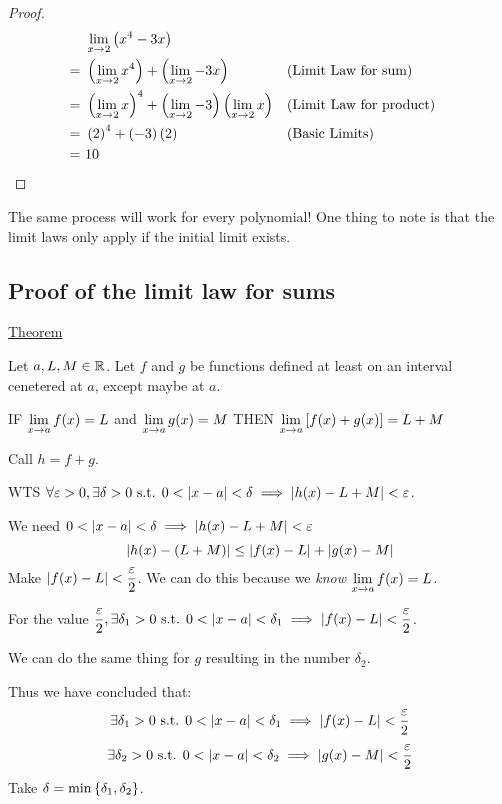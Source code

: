\begin{proof} \(\)
  \begin{align*}
    &~\lim_{x \to 2} \left(x^{4} - 3x\right) \\
    =&~\left(\lim_{x \to 2} x^{4}\right) + \left(\lim_{x \to 2} -3x\right) && \text{(Limit Law for sum)} \\
    =&~\left(\lim_{x \to 2} x\right)^{4} + \left(\lim_{x \to 2} -3\right) \left(\lim_{x \to 2} x\right) && \text{(Limit Law for product)}  \\
    =&~\left(2\right)^{4} + \left(-3\right) \left(2\right) && \text{(Basic Limits)} \\
    =&~10
  \end{align*}
\end{proof}

The same process will work for every polynomial! One thing to note is that the limit laws only apply if the initial limit exists.

\subsection{Proof of the limit law for sums}

\begin{mdframed}
  \underline{Theorem}

  Let \(a, L, M \in \mathbb{R}\). Let \(f\) and \(g\) be functions defined at least on an interval cenetered at \(a\), except maybe at \(a\).

  IF \(\displaystyle \lim_{x \to a} f(x) = L\) and \(\displaystyle \lim_{x \to a} g(x) = M\) THEN \(\displaystyle \lim_{x \to a} \left[f(x) + g(x)\right] = L + M\)
\end{mdframed}

Call \(h = f + g\).

WTS \(\forall \varepsilon > 0, \exists \delta > 0 \text{ s.t. } 0 < \left|x - a\right| < \delta \implies \left|h(x) - {L + M}\right| < \varepsilon\).

We need \(0 < \left|x - a\right| < \delta \implies \left|h(x) - {L + M}\right| < \varepsilon\)
\[\left|h(x) - \left(L + M\right)\right| \leq \left|f(x) - L\right| + \left|g(x) - M\right|\]
Make \(\displaystyle \left|f(x) - L\right| < \frac{\varepsilon}{2}\). We can do this because we \emph{know} \(\displaystyle \lim_{x \to a} f(x) = L\).

For the value \(\displaystyle \frac{\varepsilon}{2}, \exists \delta_{1} > 0 \text{ s.t. } 0 < \left|x - a\right| < \delta_{1} \implies \left|f(x) - L\right| < \frac{\varepsilon}{2}\).

We can do the same thing for \(g\) resulting in the number \(\delta_{2}\).

Thus we have concluded that:
\[\exists \delta_{1} > 0 \text{ s.t. } 0 < \left|x - a\right| < \delta_{1} \implies \left|f(x) - L\right| < \frac{\varepsilon}{2}\]
\[\exists \delta_{2} > 0 \text{ s.t. } 0 < \left|x - a\right| < \delta_{2} \implies \left|g(x) - M\right| < \frac{\varepsilon}{2}\]
Take \(\delta = \min\left\{\delta_{1}, \delta_{2}\right\}\).

